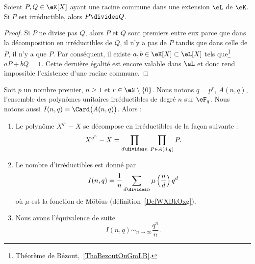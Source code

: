 \begin{lemma}   \label{LemRGuWqNu}
	Soient \( P,Q\in \eK[X]\) ayant une racine commune dans une extension \( \eL\) de \( \eK\). Si \( P\) est irréductible, alors \( P\divides Q\).
\end{lemma}

\begin{proof}
	Si \( P\) ne divise pas \( Q\), alors \( P\) et \( Q\) sont premiers entre eux parce que dans la décomposition en irréductibles de \( Q\), il n'y a pas de \( P\) tandis que dans celle de \( P\), il n'y a que \( P\). Par conséquent, il existe \( a,b\in \eK[X]\subset\eL[X]\) tels que\footnote{Théorème de Bézout,~\ref{ThoBezoutOuGmLB}.} \( aP+bQ=1\). Cette dernière égalité est encore valable dans \( \eL\) et donc rend impossible l'existence d'une racine commune.
\end{proof}

\begin{proposition} \label{PropVFNOvzZ}
	Soit \( p\) un nombre premier, \( n\geq 1\) et \( r\in \eN\setminus\{ 0 \}\). Nous notons \( q=p^r\), \( A(n,q)\), l'ensemble des polynômes unitaires irréductibles de degré \( n\) sur \( \eF_q\). Nous notons aussi \( I(n,q)=\Card\big( A(n,q) \big)\). Alors :
	\begin{enumerate}
		\item
		      Le polynôme \( X^{q^n}-X\) se décompose en irréductibles de la façon suivante :
		      \begin{equation}
			      X^{q^n}-X=\prod_{d\divides n}\,\prod_{P\in A(d,q)}P.
		      \end{equation}
		\item
		      Le nombre d'irréductibles est donné par
		      \begin{equation}
			      I(n,q)=\frac{1}{ n }\sum_{d\divides n}\mu\left( \frac{ n }{ d } \right)q^d
		      \end{equation}
		      où \( \mu\) est la fonction de Möbius (définition~\ref{DefWXBkOxg}).
		\item
		      Nous avons l'équivalence de suite
		      \begin{equation}
			      I(n,q)\sim_{n\to\infty}\frac{ q^n }{ n }.
		      \end{equation}
	\end{enumerate}
\end{proposition}

